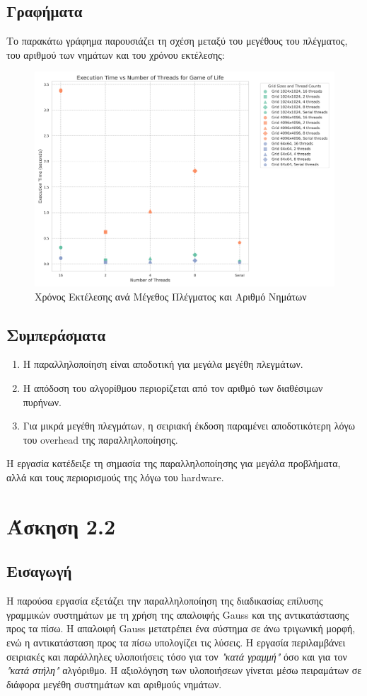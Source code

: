 \documentclass{article}
\begin{document}
\subsection*{Γραφήματα}
Το παρακάτω γράφημα παρουσιάζει τη σχέση μεταξύ του μεγέθους του πλέγματος, του αριθμού των νημάτων και του χρόνου εκτέλεσης:
\begin{figure}[h]
    \centering
    \includegraphics[width=1\textwidth]{game_of_life_results.png}
    \caption{Χρόνος Εκτέλεσης ανά Μέγεθος Πλέγματος και Αριθμό Νημάτων}
\end{figure}
\subsection*{Συμπεράσματα}
\begin{enumerate}
    \item Η παραλληλοποίηση είναι αποδοτική για μεγάλα μεγέθη πλεγμάτων.
    \item Η απόδοση του αλγορίθμου περιορίζεται από τον αριθμό των διαθέσιμων πυρήνων.
    \item Για μικρά μεγέθη πλεγμάτων, η σειριακή έκδοση παραμένει αποδοτικότερη λόγω του overhead της παραλληλοποίησης.
\end{enumerate}
Η εργασία κατέδειξε τη σημασία της παραλληλοποίησης για μεγάλα προβλήματα, αλλά και τους περιορισμούς της λόγω του hardware.
\section*{Άσκηση 2.2}
\subsection*{Εισαγωγή} 
Η παρούσα εργασία εξετάζει την παραλληλοποίηση της διαδικασίας επίλυσης γραμμικών συστημάτων με τη χρήση της απαλοιφής Gauss και της αντικατάστασης προς τα πίσω. Η απαλοιφή Gauss μετατρέπει ένα σύστημα σε άνω τριγωνική μορφή, ενώ η αντικατάσταση προς τα πίσω υπολογίζει τις λύσεις. Η εργασία περιλαμβάνει σειριακές και παράλληλες υλοποιήσεις τόσο για τον \textit{"κατά γραμμή"} όσο και για τον \textit{"κατά στήλη"} αλγόριθμο. Η αξιολόγηση των υλοποιήσεων γίνεται μέσω πειραμάτων σε διάφορα μεγέθη συστημάτων και αριθμούς νημάτων.
\end{document}
